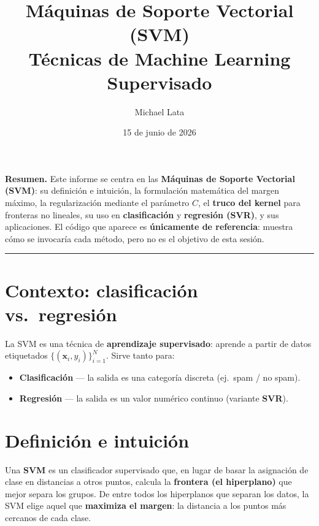 \documentclass[11pt,a4paper]{article}
\title{\vspace{-1.2cm}\textcolor{ColPrim}{\textbf{Máquinas de Soporte Vectorial (SVM)}}\\[4pt]
\large Técnicas de Machine Learning Supervisado}
\author{Michael Lata}
\date{15 de junio de 2026}
\begin{document}
\maketitle
\thispagestyle{fancy}

\noindent\textbf{Resumen.} Este informe se centra en las \textbf{Máquinas de Soporte Vectorial
(SVM)}: su definición e intuición, la formulación matemática del margen máximo, la
regularización mediante el parámetro $C$, el \textbf{truco del kernel} para fronteras no
lineales, su uso en \textbf{clasificación} y \textbf{regresión (SVR)}, y sus aplicaciones.
El código que aparece es \textbf{únicamente de referencia}: muestra cómo se invocaría cada
método, pero no es el objetivo de esta sesión.

\tableofcontents
\vspace{0.3cm}\hrule\vspace{0.4cm}

\section{Contexto: clasificación vs.\ regresión}
La SVM es una técnica de \textbf{aprendizaje supervisado}: aprende a partir de datos
etiquetados $\{(\mathbf{x}_i, y_i)\}_{i=1}^{N}$. Sirve tanto para:
\begin{itemize}[leftmargin=1.4em,nosep]
  \item \textbf{Clasificación} — la salida es una categoría discreta (ej.\ spam / no spam).
  \item \textbf{Regresión} — la salida es un valor numérico continuo (variante \textbf{SVR}).
\end{itemize}

\section{Definición e intuición}
Una \textbf{SVM} es un clasificador supervisado que, en lugar de basar la asignación de clase en
distancias a otros puntos, calcula la \textbf{frontera (el hiperplano)} que mejor separa los
grupos. De entre todos los hiperplanos que separan los datos, la SVM elige aquel que
\textbf{maximiza el margen}: la distancia a los puntos más cercanos de cada clase.
\end{document}
